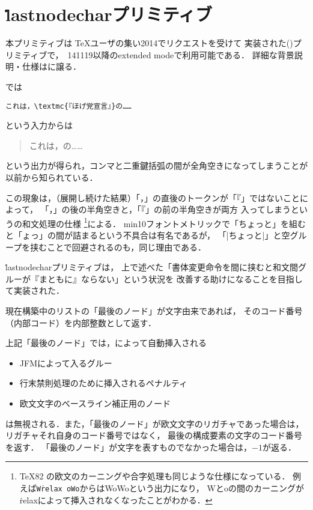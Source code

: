 \documentclass[a4paper,11pt,nomag]{jsarticle}
\begin{document}
\section{\.{lastnodechar}プリミティブ}
本プリミティブは
\TeX ユーザの集い2014でリクエストを受けて
実装された(\cite{pdfse})プリミティブで，\epTeX~141119以降のextended modeで利用可能である．
詳細な背景説明・仕様は\cite{lnc}に譲る．

\pTeX では
\begin{verbatim}
これは，\textmc{『ほげ党宣言』}の……
\end{verbatim}
という入力からは
\begin{quote}
これは，の……
\end{quote}
という出力が得られ，コンマと二重鍵括弧の間が全角空きになってしまうことが以前から知られている．

この現象は，（展開し続けた結果）「，」の直後のトークンが「『」ではないことによって，
「，」の後の半角空きと，「『」の前の半角空きが両方
入ってしまうという\pTeX の和文処理の仕様
\footnote{%
  \TeX82 の欧文のカーニングや合字処理も同じような仕様になっている．
  例えば\texttt{W\.{relax}\ oWo}からはW\relax oWoという出力になり，
  Wとoの間のカーニングが\.{relax}によって挿入されなくなったことがわかる．
}による．
min10フォントメトリックで「ちょっと」を組むと「ょっ」の間が詰まるという不具合は有名であるが，
「|ちょ{}っと|」と空グループを挟むことで回避されるのも，同じ理由である．

\medskip

\.{lastnodechar}プリミティブは，
上で述べた「書体変更命令を間に挟むと和文間グルーが『まともに』ならない」という状況を
改善する助けになることを目指して実装された．

\begin{cslist}
  現在構築中のリストの「最後のノード」が文字由来であれば，
  そのコード番号（内部コード）を内部整数として返す．

  上記「最後のノード」では，\pTeX によって自動挿入される
  \begin{itemize}
    \item JFMによって入るグルー
    \item 行末禁則処理のために挿入されるペナルティ
    \item 欧文文字のベースライン補正用のノード
  \end{itemize}
  は無視される．また，「最後のノード」が欧文文字のリガチャであった場合は，
  リガチャそれ自身のコード番号ではなく，
  最後の構成要素の文字のコード番号を返す．
  「最後のノード」が文字を表すものでなかった場合は，$-1$が返る．
\end{cslist}
\end{document}
